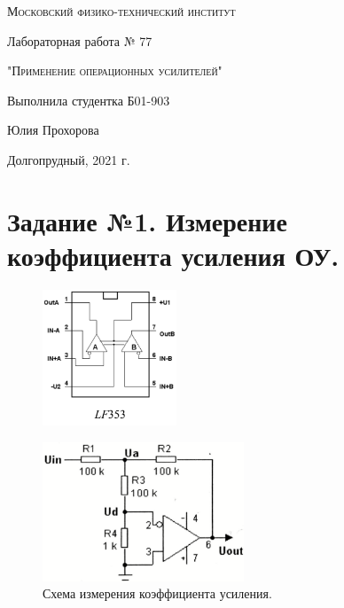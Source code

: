 \documentclass[a4paper]{article}
\begin{document}
\begin{titlepage}
	\centering
	\vspace{5cm}
	{\scshape\LARGE Московский физико-технический институт \par}
	\vspace{5cm}

	{\huge Лабораторная работа № 77 \par}
	\vspace{1cm}
	{\scshape\Large "Применение операционных усилителей"\par}
	\vspace{2cm}
	\vfill
\begin{flushright}
	{\Large Выполнила студентка Б01-903}\par
	\vspace{0.3cm}
	{\LARGE Юлия Прохорова} \par

	
\end{flushright}
	

	\vfill\large

	Долгопрудный, 2021 г.
\end{titlepage}

\section{Задание №1. Измерение коэффициента усиления ОУ.}


 \begin{figure}[H]
        \begin{center}
        \includegraphics[width=4cm]{lf353.png}
        \label{real} %
        \end{center}
    \end{figure}

    \begin{figure}[H]
        \begin{center}
        \includegraphics[width=6cm]{задание_1.png}
        \caption{Схема измерения коэффициента усиления.}
        \label{2} %
        \end{center}
    \end{figure}
    
\end{document}
